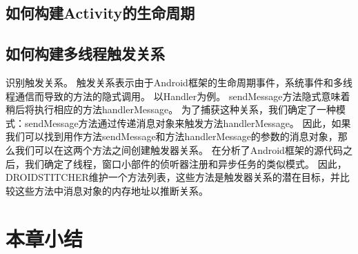 \subsection{如何构建Activity的生命周期}


 \subsection{如何构建多线程触发关系}




识别触发关系。
触发关系表示由于Android框架的生命周期事件，系统事件和多线程通信而导致的方法的隐式调用。
以Handler为例。 sendMessage方法隐式意味着稍后将执行相应的方法handlerMessage。
为了捕获这种关系，我们确定了一种模式：sendMessage方法通过传递消息对象来触发方法handlerMessage。
因此，如果我们可以找到用作方法sendMessage和方法handlerMessage的参数的消息对象，那么我们可以在这两个方法之间创建触发器关系。
在分析了Android框架的源代码之后，我们确定了线程，窗口小部件的侦听器注册和异步任务的类似模式。
因此，DROIDSTITCHER维护一个方法列表，这些方法是触发器关系的潜在目标，并比较这些方法中消息对象的内存地址以推断关系。


 \section{本章小结}
